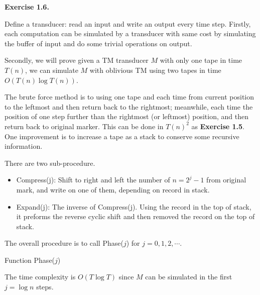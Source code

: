 \documentclass[a4paper]{article}
\newenvironment{exercise}[1]{
	\par
	\noindent\textbf{Exercise #1.}\quad
}{
	\par
	\bigskip
}
\begin{document}
\begin{exercise}{1.6}
    Define a transducer: read an input and write an output every time step. 
    Firstly, each computation can be simulated by a transducer with same cost by 
    simulating the buffer of input and do some trivial operations on output.

    Secondly, we will prove given a TM transducer $M$ with only one tape in time $T(n)$, 
    we can simulate $M$ with oblivious TM using two tapes in time $O(T(n)\log T(n))$.

    The brute force method is to using one tape and each time from current position to the leftmost and 
    then return back to the rightmost; meanwhile, each time the position of one step further than 
    the rightmost (or leftmost) position, and then return back to original marker. 
    This can be done in $T(n)^{2}$ as \textbf{Exercise 1.5}. 
    One improvement is to increase a tape as a stack to conserve some recursive information.

    There are two sub-procedure.
    \begin{itemize}
        \item Compress(j): Shift to right and left the number of $n=2^{j}-1$ from original mark, 
            and write on one of them, depending on record in stack.
        \item Expand(j): The inverse of Compress(j). Using the record in the top of stack, 
            it preforms the reverse cyclic shift and then removed the record on the top of stack.
    \end{itemize}
    The overall procedure is to call Phase($j$) for $j=0,1,2,\cdots$.
    \begin{center}
    \begin{algorithm}[H]
    \caption{Function Phase($j$)}
    \end{algorithm}
    \end{center}
    The time complexity is $O(T\log T)$ since $M$ can be simulated in the first $j = \log n$ steps.
\end{exercise}
\end{document}
